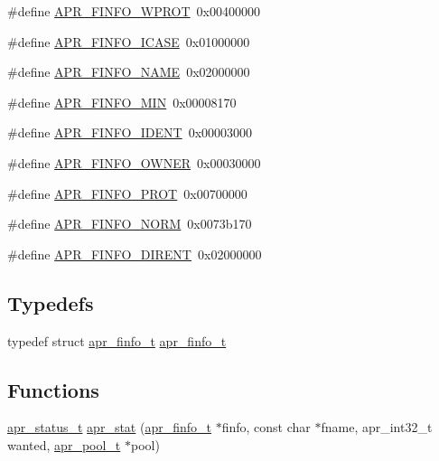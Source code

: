 \begin{DoxyCompactItemize}
\item 
\#define \hyperlink{group__apr__file__stat_gab970792384fe9a805cf66983350eefdc}{A\+P\+R\+\_\+\+F\+I\+N\+F\+O\+\_\+\+W\+P\+R\+OT}~0x00400000
\item 
\#define \hyperlink{group__apr__file__stat_gac46eeba0ae0e771c6ed3cb27fd5492d8}{A\+P\+R\+\_\+\+F\+I\+N\+F\+O\+\_\+\+I\+C\+A\+SE}~0x01000000
\item 
\#define \hyperlink{group__apr__file__stat_ga7fa4caf84808c11a1ec33c5c8d613e4b}{A\+P\+R\+\_\+\+F\+I\+N\+F\+O\+\_\+\+N\+A\+ME}~0x02000000
\item 
\#define \hyperlink{group__apr__file__stat_ga341104571b05550aa923cb14898a82ef}{A\+P\+R\+\_\+\+F\+I\+N\+F\+O\+\_\+\+M\+IN}~0x00008170
\item 
\#define \hyperlink{group__apr__file__stat_ga3ac8c8d0492291417be3d32556464108}{A\+P\+R\+\_\+\+F\+I\+N\+F\+O\+\_\+\+I\+D\+E\+NT}~0x00003000
\item 
\#define \hyperlink{group__apr__file__stat_ga27dee9407b38a459c57618098c3920b0}{A\+P\+R\+\_\+\+F\+I\+N\+F\+O\+\_\+\+O\+W\+N\+ER}~0x00030000
\item 
\#define \hyperlink{group__apr__file__stat_gad902be0636860cb3f8ad76a59abbcd7c}{A\+P\+R\+\_\+\+F\+I\+N\+F\+O\+\_\+\+P\+R\+OT}~0x00700000
\item 
\#define \hyperlink{group__apr__file__stat_gad3f64010d25d2fe926191804d7c99379}{A\+P\+R\+\_\+\+F\+I\+N\+F\+O\+\_\+\+N\+O\+RM}~0x0073b170
\item 
\#define \hyperlink{group__apr__file__stat_gaac6679307cc735f2f0373960db96b931}{A\+P\+R\+\_\+\+F\+I\+N\+F\+O\+\_\+\+D\+I\+R\+E\+NT}~0x02000000
\end{DoxyCompactItemize}
\subsection*{Typedefs}
\begin{DoxyCompactItemize}
\item 
typedef struct \hyperlink{structapr__finfo__t}{apr\+\_\+finfo\+\_\+t} \hyperlink{group__apr__file__stat_ga3d390fdda1d16ae462c11b2d3b18efd1}{apr\+\_\+finfo\+\_\+t}
\end{DoxyCompactItemize}
\subsection*{Functions}
\begin{DoxyCompactItemize}
\item 
\hyperlink{group__apr__errno_gaf76ee4543247e9fb3f3546203e590a6c}{apr\+\_\+status\+\_\+t} \hyperlink{group__apr__file__stat_gafb0f4a4fa4545c155e20ddd8f2001c1a}{apr\+\_\+stat} (\hyperlink{structapr__finfo__t}{apr\+\_\+finfo\+\_\+t} $\ast$finfo, const char $\ast$fname, apr\+\_\+int32\+\_\+t wanted, \hyperlink{group__apr__pools_gaf137f28edcf9a086cd6bc36c20d7cdfb}{apr\+\_\+pool\+\_\+t} $\ast$pool)
\end{DoxyCompactItemize}


